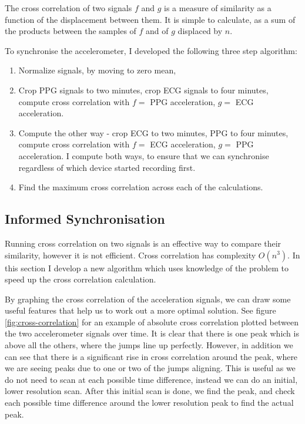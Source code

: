 \documentclass[12pt,a4paper,twoside,openany]{report}
\begin{document}
The cross correlation of two signals \(f\) and \(g\) is a measure of
similarity as a function of the displacement between them. It is simple to
calculate, as a sum of the products between the samples of \(f\) and of \(g\)
displaced by \(n\).

To synchronise the accelerometer, I developed the following three step 
algorithm:
\begin{enumerate}
	\item Normalize signals, by moving to zero mean, 

	\item Crop PPG signals to two minutes, crop ECG signals to four
		minutes, compute cross correlation with \(f=\) PPG
		acceleration, \(g=\) ECG acceleration.

	\item Compute the other way - crop ECG to two minutes, PPG to four
		minutes, compute cross correlation with \(f=\) ECG
		acceleration, \(g=\) PPG acceleration. I compute both ways, to
		ensure that we can synchronise regardless of which device
		started recording first.

	\item Find the maximum cross correlation across each of the
		calculations.







\end{enumerate}

\subsection{Informed Synchronisation}

Running cross correlation on two signals is an effective way to compare their
similarity, however it is not efficient. Cross correlation has complexity
\(O(n^3)\). In this section I develop a new algorithm which uses knowledge of
the problem to speed up the cross correlation calculation.

By graphing the cross correlation of the acceleration signals, we can draw
some useful features that help us to work out a more optimal solution. See
figure \ref{fig:cross-correlation} for an example of absolute cross correlation plotted
between the two accelerometer signals over time. It is clear that there is one
peak which is above all the others, where the jumps line up perfectly.
However, in addition we can see that there is a significant rise in cross
correlation around the peak, where we are seeing peaks due to one or two of
the jumps aligning. This is useful as we do not need to scan at each
possible time difference, instead we can do an initial, lower resolution scan.
After this initial scan is done, we find the peak, and check each possible
time difference around the lower resolution peak to find the actual peak.
\end{document}
